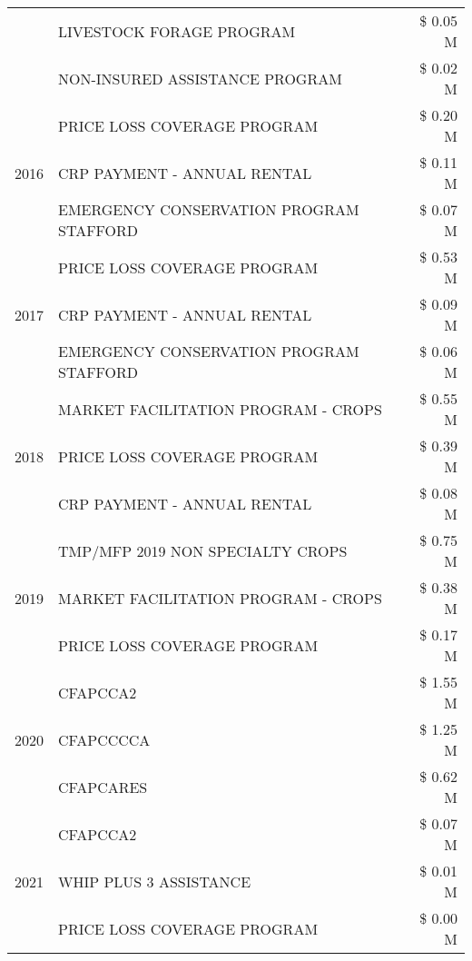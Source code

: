 \begin{tabular}{llr}
 & LIVESTOCK FORAGE PROGRAM & \$ 0.05 M \\
 & NON-INSURED ASSISTANCE PROGRAM & \$ 0.02 M \\
\cline{1-3}
\multirow[t]{3}{*}{2016} & PRICE LOSS COVERAGE PROGRAM & \$ 0.20 M \\
 & CRP PAYMENT - ANNUAL RENTAL & \$ 0.11 M \\
 & EMERGENCY CONSERVATION PROGRAM STAFFORD & \$ 0.07 M \\
\cline{1-3}
\multirow[t]{3}{*}{2017} & PRICE LOSS COVERAGE PROGRAM & \$ 0.53 M \\
 & CRP PAYMENT - ANNUAL RENTAL & \$ 0.09 M \\
 & EMERGENCY CONSERVATION PROGRAM STAFFORD & \$ 0.06 M \\
\cline{1-3}
\multirow[t]{3}{*}{2018} & MARKET FACILITATION PROGRAM - CROPS & \$ 0.55 M \\
 & PRICE LOSS COVERAGE PROGRAM & \$ 0.39 M \\
 & CRP PAYMENT - ANNUAL RENTAL & \$ 0.08 M \\
\cline{1-3}
\multirow[t]{3}{*}{2019} & TMP/MFP 2019 NON SPECIALTY CROPS & \$ 0.75 M \\
 & MARKET FACILITATION PROGRAM - CROPS & \$ 0.38 M \\
 & PRICE LOSS COVERAGE PROGRAM & \$ 0.17 M \\
\cline{1-3}
\multirow[t]{3}{*}{2020} & CFAPCCA2 & \$ 1.55 M \\
 & CFAPCCCCA & \$ 1.25 M \\
 & CFAPCARES & \$ 0.62 M \\
\cline{1-3}
\multirow[t]{3}{*}{2021} & CFAPCCA2 & \$ 0.07 M \\
 & WHIP PLUS 3 ASSISTANCE & \$ 0.01 M \\
 & PRICE LOSS COVERAGE PROGRAM & \$ 0.00 M \\
\cline{1-3}
\bottomrule
\end{tabular}
